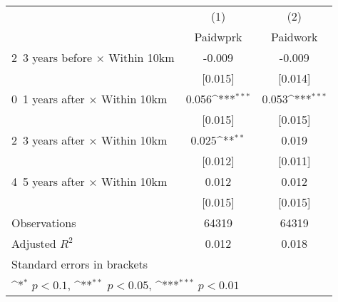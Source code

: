 {
\def\sym#1{\ifmmode^{#1}\else\(^{#1}\)\fi}
\begin{tabular}{l*{2}{c}}
\hline\hline
                    &\multicolumn{1}{c}{(1)}&\multicolumn{1}{c}{(2)}\\
                    &\multicolumn{1}{c}{Paidwprk}&\multicolumn{1}{c}{Paidwork}\\
\hline
2~3 years before × Within 10km&      -0.009         &      -0.009         \\
                    &     [0.015]         &     [0.014]         \\
0~1 years after × Within 10km&       0.056\sym{***}&       0.053\sym{***}\\
                    &     [0.015]         &     [0.015]         \\
2~3 years after × Within 10km&       0.025\sym{**} &       0.019         \\
                    &     [0.012]         &     [0.011]         \\
4~5 years after × Within 10km&       0.012         &       0.012         \\
                    &     [0.015]         &     [0.015]         \\
\hline
Observations        &       64319         &       64319         \\
Adjusted \(R^{2}\)  &       0.012         &       0.018         \\
\hline\hline
\multicolumn{3}{l}{\footnotesize Standard errors in brackets}\\
\multicolumn{3}{l}{\footnotesize \sym{*} \(p<0.1\), \sym{**} \(p<0.05\), \sym{***} \(p<0.01\)}\\
\end{tabular}
}
